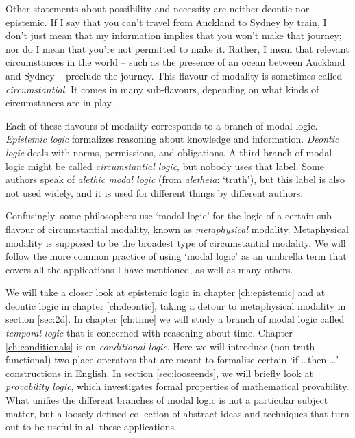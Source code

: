 
Other statements about possibility and necessity are neither deontic nor
epistemic. If I say that you can't travel from Auckland to Sydney by train, I
don't just mean that my information implies that you won't make that journey;
nor do I mean that you're not permitted to make it. Rather, I mean that relevant
circumstances in the world -- such as the presence of an ocean between Auckland
and Sydney -- preclude the journey. This flavour of modality is sometimes called
\emph{circumstantial}. It comes in many sub-flavours, depending on what kinds of
circumstances are in play.



Each of these flavours of modality corresponds to a branch of modal logic.
\emph{Epistemic logic} formalizes reasoning about knowledge and information.
\emph{Deontic logic} deals with norms, permissions, and obligations. A third
branch of modal logic might be called \emph{circumstantial logic}, but nobody
uses that label. Some authors speak of \emph{alethic modal logic} (from
\emph{aletheia}: `truth'), but this label is also not used widely, and it is
used for different things by different authors.



Confusingly, some philosophers use `modal logic' for the logic of a certain
sub-flavour of circumstantial modality, known as \emph{metaphysical} modality.
Metaphysical modality is supposed to be the broadest type of circumstantial
modality. We will follow the more common practice of using `modal logic' as an
umbrella term that covers all the applications I have mentioned, as well as many
others.


We will take a closer look at epistemic logic in chapter \ref{ch:epistemic} and
at deontic logic in chapter \ref{ch:deontic}, taking a detour to metaphysical
modality in section \ref{sec:2d}. In chapter \ref{ch:time} we will study a
branch of modal logic called \emph{temporal logic} that is concerned with
reasoning about time. Chapter \ref{ch:conditionals} is on \emph{conditional
  logic}. Here we will introduce (non-truth-functional) two-place operators that
are meant to formalise certain `if \ldots then \ldots' constructions in English.
In section \ref{sec:looseends}, we will briefly look at \emph{provability logic},
which investigates formal properties of mathematical provability. What unifies
the different branches of modal logic is not a particular subject matter, but a
loosely defined collection of abstract ideas and techniques that turn out to be
useful in all these applications.

